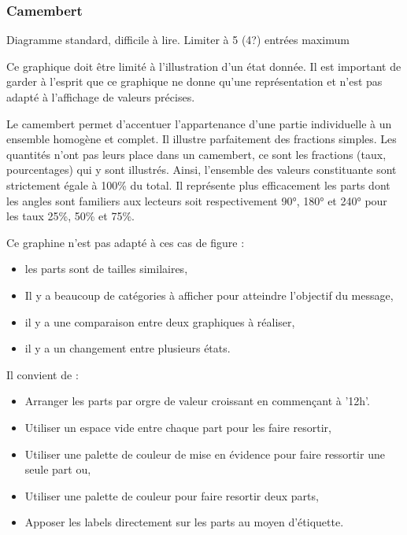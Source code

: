 \documentclass[a4paper,12pt]{article}
\begin{document}
\begin{multicols}{2}
\subsubsection*{Camembert}
\label{sec:orgee9dc92}
Diagramme standard, difficile à lire. \autocite{alansmithLexiqueVisuel}
Limiter à 5 (4?) entrées maximum \autocite{mikeyiHowChooseRight2020}

Ce graphique doit être limité à l'illustration d'un état donnée. Il est important de garder à l'esprit que ce graphique ne donne qu'une représentation et n'est pas adapté à l'affichage de valeurs précises. \autocite{jonathanschwabishParttowhole2021}

Le camembert permet d'accentuer l'appartenance d'une partie individuelle à un ensemble homogène et complet. Il illustre parfaitement des fractions simples.\autocite{wilkeDirectoryVisualizations2019} Les quantités n'ont pas leurs place dans un camembert, ce sont les fractions (taux, pourcentages) qui y sont illustrés. Ainsi, l'ensemble des valeurs constituante sont strictement égale à 100\% du total.\autocite{wilkeVisualizingAmounts2019} Il représente plus efficacement les parts dont les angles sont familiers aux lecteurs soit respectivement 90°, 180° et 240° pour les taux 25\%, 50\% et 75\%.

Ce graphine n'est pas adapté à ces cas de figure :
\begin{itemize}
\item les parts sont de tailles similaires,\autocite{sosulskiGraphics2019}
\item Il y a beaucoup de catégories à afficher pour atteindre l'objectif du message,
\item il y a une comparaison entre deux graphiques à réaliser,\autocite{jonathanschwabishParttowhole2021}
\item il y a un changement entre plusieurs états.\autocite{wilkeDirectoryVisualizations2019}
\end{itemize}

Il convient de :
\begin{itemize}
\item Arranger les parts par orgre de valeur croissant en commençant à '12h'. \autocite{jonathanschwabishParttowhole2021}
\item Utiliser un espace vide entre chaque part pour les faire resortir, \autocite{sosulskiGraphics2019}
\item Utiliser une palette de couleur de mise en évidence pour faire ressortir une seule part ou,
\item Utiliser une palette de couleur pour faire resortir deux parts,
\item Apposer les labels directement sur les parts au moyen d'étiquette. \autocite{sosulskiGraphics2019}
\end{itemize}


\end{multicols}
\end{document}
